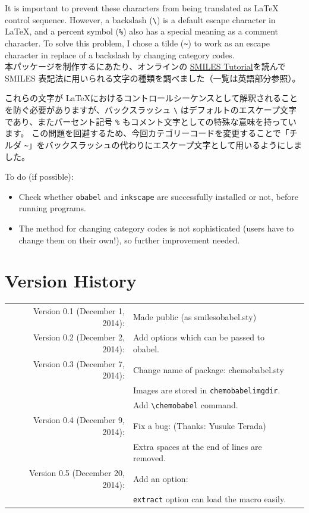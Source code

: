 \documentclass[12pt]{jsarticle}
\begin{document}
It is important to prevent these characters from being translated as {\LaTeX} control sequence.
However, a backslash (\verb|\|) is a default escape character in {\LaTeX}, and a percent symbol (\verb|%|) also has a special meaning as a comment character.
To solve this problem, I chose a tilde (\verb|~|) to work as an escape character in replace of a backslash by changing category codes. \\

本パッケージを制作するにあたり、オンラインの \href{http://www.daylight.com/meetings/summerschool98/course/dave/smiles-intro.html}{SMILES Tutorial}を読んで SMILES 表記法に用いられる文字の種類を調べました（一覧は英語部分参照）。

これらの文字が \LaTeX におけるコントロールシーケンスとして解釈されることを防ぐ必要がありますが、バックスラッシュ \verb|\| はデフォルトのエスケープ文字であり、またパーセント記号 \verb|%| もコメント文字としての特殊な意味を持っています。
この問題を回避するため、今回カテゴリーコードを変更することで「チルダ \verb|~|」をバックスラッシュの代わりにエスケープ文字として用いるようにしました。

\clearpage

To do (if possible):
\begin{itemize}
\item Check whether \texttt{obabel} and \texttt{inkscape} are successfully installed or not, before running programs.
\item The method for changing category codes is not sophisticated (users have to change them on their own!), so further improvement needed.
\end{itemize}

\section{Version History}

\begin{table}[h]
\centering
\begin{tabular}{rll}
Version 0.1 (December 1, 2014): & Made public (as \textsf{smilesobabel.sty}) \\
Version 0.2 (December 2, 2014): & Add options which can be passed to obabel. \\
Version 0.3 (December 7, 2014): & Change name of package: \textsf{chemobabel.sty} \\
 & Images are stored in \texttt{chemobabelimgdir}. \\
 & Add \verb|\chemobabel| command. \\
Version 0.4 (December 9, 2014): & Fix a bug: (Thanks: Yusuke Terada) \\
 & Extra spaces at the end of lines are removed. \\
Version 0.5 (December 20, 2014): & Add an option: \\
 & \verb|extract| option can load the macro easily.
\end{tabular}
\end{table}
\end{document}
